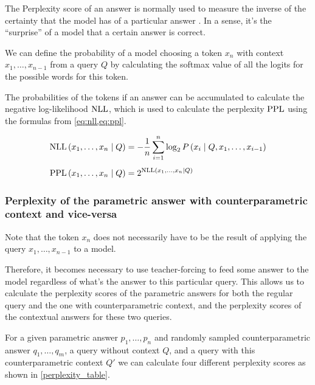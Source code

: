 The Perplexity score of an answer is normally used to measure the inverse of the certainty that the model has of a particular answer \citep{gpt3,retro}.
In a sense, it's the ``surprise'' of a model that a certain answer is correct.

We can define the probability of a model choosing a token $x_n$ with context $x_1, \dots, x_{n - 1}$ from a query $Q$ by calculating the softmax value of all the logits for the possible words for this token.

The probabilities of the tokens if an answer can be accumulated to calculate the negative log-likelihood $\text{NLL}$, which is used to calculate the perplexity $\text{PPL}$ using the formulas from \cref{eq:nll,eq:ppl}.

\begin{align}
	\text{NLL} \left( x_1, \dots, x_n \mid Q \right) &= - \frac{1}{n} \sum^n_{i = 1} \log_2 P \left( x_i \mid Q, x_1, \dots, x_{i - 1} \right) \label{eq:nll} \\[1ex]
	\text{PPL} \left( x_1, \dots, x_n \mid Q \right) &= {2 ^ {\text{NLL} \left( x_1, \dots, x_n \mid Q \right)}} \label{eq:ppl}
\end{align}


\subsubsection{Perplexity of the parametric answer with counterparametric context and vice-versa}

Note that the token $x_n$ does not necessarily have to be the result of applying the query $x_1, \dots, x_{n - 1}$ to a model.

Therefore, it becomes necessary to use teacher-forcing \citep{teacher_forcing} to feed some answer to the model regardless of what's the answer to this particular query. This allows us to calculate the perplexity scores of the parametric answers for both the regular query and the one with counterparametric context, and the perplexity scores of the contextual answers for these two queries.

For a given parametric answer $p_1, \dots, p_n$ and randomly sampled counterparametric answer $q_1, \dots, q_m$, a query without context $Q$, and a query with this counterparametric context $Q'$ we can calculate four different perplexity scores as shown in \cref{perplexity_table}.


